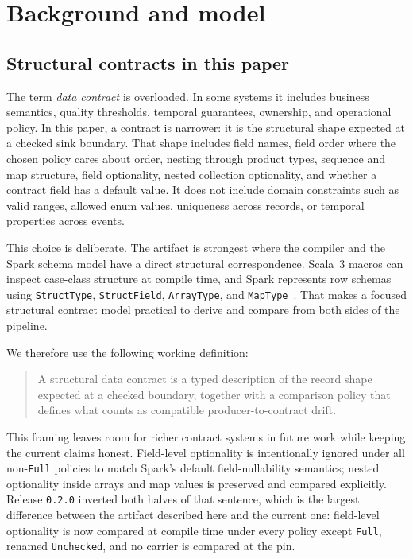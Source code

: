 \section{Background and model}

\subsection{Structural contracts in this paper}

The term \emph{data contract} is overloaded. In some systems it includes business semantics, quality thresholds, temporal guarantees, ownership, and operational policy. In this paper, a contract is narrower: it is the structural shape expected at a checked sink boundary. That shape includes field names, field order where the chosen policy cares about order, nesting through product types, sequence and map structure, field optionality, nested collection optionality, and whether a contract field has a default value. It does not include domain constraints such as valid ranges, allowed enum values, uniqueness across records, or temporal properties across events.

This choice is deliberate. The artifact is strongest where the compiler and the Spark schema model have a direct structural correspondence. Scala~3 macros can inspect case-class structure at compile time, and Spark represents row schemas using \texttt{StructType}, \texttt{StructField}, \texttt{ArrayType}, and \texttt{MapType}~\cite{scala3_reflection,spark_structtype}. That makes a focused structural contract model practical to derive and compare from both sides of the pipeline.

We therefore use the following working definition:

\begin{quote}
A structural data contract is a typed description of the record shape expected at a checked boundary, together with a comparison policy that defines what counts as compatible producer-to-contract drift.
\end{quote}

This framing leaves room for richer contract systems in future work while keeping the current claims honest. Field-level optionality is intentionally ignored under all non-\texttt{Full} policies to match Spark's default field-nullability semantics; nested optionality inside arrays and map values is preserved and compared explicitly. Release \texttt{0.2.0} inverted both halves of that sentence, which is the largest difference between the artifact described here and the current one: field-level optionality is now compared at compile time under every policy except \texttt{Full}, renamed \texttt{Unchecked}, and no carrier is compared at the pin.

